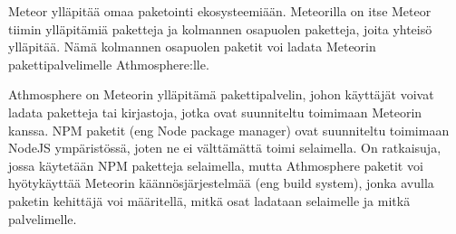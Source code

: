 

Meteor ylläpitää omaa paketointi ekosysteemiään. 
Meteorilla on itse Meteor tiimin ylläpitämiä paketteja ja kolmannen osapuolen paketteja,
joita yhteisö ylläpitää. Nämä kolmannen osapuolen paketit voi ladata Meteorin pakettipalvelimelle Athmosphere:lle.\\
\medskip


Athmosphere on Meteorin ylläpitämä pakettipalvelin, johon käyttäjät voivat ladata paketteja tai kirjastoja,
jotka ovat suunniteltu toimimaan Meteorin kanssa.
NPM paketit (eng Node package manager) ovat suunniteltu toimimaan NodeJS ympäristössä, joten ne ei välttämättä toimi selaimella.
On ratkaisuja, jossa käytetään NPM paketteja selaimella, mutta
Athmosphere paketit voi hyötykäyttää Meteorin käännösjärjestelmää (eng build system),
jonka avulla paketin kehittäjä voi määritellä, mitkä osat ladataan selaimelle ja mitkä palvelimelle.

